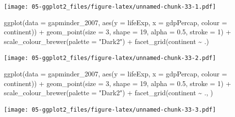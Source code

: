 \documentclass[
]{book}
\newenvironment{Shaded}{\begin{snugshade}}{\end{snugshade}}
\newcommand{\AttributeTok}[1]{\textcolor[rgb]{0.77,0.63,0.00}{#1}}
\newcommand{\DecValTok}[1]{\textcolor[rgb]{0.00,0.00,0.81}{#1}}
\newcommand{\FloatTok}[1]{\textcolor[rgb]{0.00,0.00,0.81}{#1}}
\newcommand{\FunctionTok}[1]{\textcolor[rgb]{0.00,0.00,0.00}{#1}}
\newcommand{\NormalTok}[1]{#1}
\newcommand{\SpecialCharTok}[1]{\textcolor[rgb]{0.00,0.00,0.00}{#1}}
\newcommand{\StringTok}[1]{\textcolor[rgb]{0.31,0.60,0.02}{#1}}
\begin{document}
\texttt{[image: 05-ggplot2\_files/figure-latex/unnamed-chunk-33-1.pdf]}

\begin{Shaded}
\begin{Highlighting}[]


\FunctionTok{ggplot}\NormalTok{(}\AttributeTok{data =}\NormalTok{ gapminder\_2007, }\FunctionTok{aes}\NormalTok{(}\AttributeTok{y =}\NormalTok{ lifeExp, }\AttributeTok{x =}\NormalTok{ gdpPercap, }\AttributeTok{colour =}\NormalTok{ continent)) }\SpecialCharTok{+} 
  \FunctionTok{geom\_point}\NormalTok{(}\AttributeTok{size =} \DecValTok{3}\NormalTok{, }\AttributeTok{shape =} \DecValTok{19}\NormalTok{, }\AttributeTok{alpha =} \FloatTok{0.5}\NormalTok{, }\AttributeTok{stroke =} \DecValTok{1}\NormalTok{) }\SpecialCharTok{+}
  \FunctionTok{scale\_colour\_brewer}\NormalTok{(}\AttributeTok{palette =} \StringTok{"Dark2"}\NormalTok{) }\SpecialCharTok{+}
  \FunctionTok{facet\_grid}\NormalTok{(continent }\SpecialCharTok{\textasciitilde{}}\NormalTok{ .)}
\end{Highlighting}
\end{Shaded}

\texttt{[image: 05-ggplot2\_files/figure-latex/unnamed-chunk-33-2.pdf]}

\begin{Shaded}
\begin{Highlighting}[]


\FunctionTok{ggplot}\NormalTok{(}\AttributeTok{data =}\NormalTok{ gapminder\_2007, }\FunctionTok{aes}\NormalTok{(}\AttributeTok{y =}\NormalTok{ lifeExp, }\AttributeTok{x =}\NormalTok{ gdpPercap, }\AttributeTok{colour =}\NormalTok{ continent)) }\SpecialCharTok{+} 
  \FunctionTok{geom\_point}\NormalTok{(}\AttributeTok{size =} \DecValTok{3}\NormalTok{, }\AttributeTok{shape =} \DecValTok{19}\NormalTok{, }\AttributeTok{alpha =} \FloatTok{0.5}\NormalTok{, }\AttributeTok{stroke =} \DecValTok{1}\NormalTok{) }\SpecialCharTok{+}
  \FunctionTok{scale\_colour\_brewer}\NormalTok{(}\AttributeTok{palette =} \StringTok{"Dark2"}\NormalTok{) }\SpecialCharTok{+}
  \FunctionTok{facet\_grid}\NormalTok{(continent }\SpecialCharTok{\textasciitilde{}}\NormalTok{ ., )}
\end{Highlighting}
\end{Shaded}

\texttt{[image: 05-ggplot2\_files/figure-latex/unnamed-chunk-33-3.pdf]}
\end{document}
